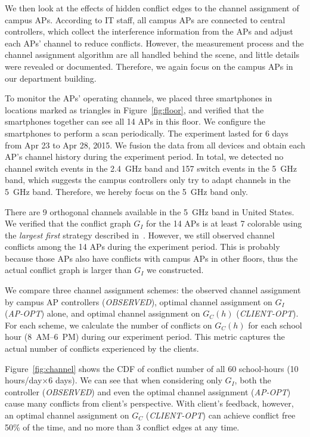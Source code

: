 We then look at the effects of hidden conflict edges to the channel assignment
of campus APs. According to \ub{} IT staff, all campus APs are connected to
central controllers, which collect the interference information from the APs and
adjust each APs' channel to reduce conflicts. However, the measurement process
and the channel assignment algorithm are all handled behind the scene, and
little details were revealed or documented. Therefore, we again focus on
the campus APs in our department building.

To monitor the APs' operating channels, we placed three smartphones in locations
marked as triangles in Figure~\ref{fig:floor}, and verified that the smartphones
together can see all 14 APs in this floor. We configure the smartphones to
perform a \wifi{} scan periodically. The experiment lasted for 6 days from Apr
23 to Apr 28, 2015. We fusion the data from all devices and obtain each AP's
channel history during the experiment period. In total, we detected no channel
switch events in the 2.4~GHz band and 157 switch events in the 5~GHz band, which
suggests the campus controllers only try to adapt channels in the 5~GHz band.
Therefore, we hereby focus on the 5~GHz band only.

There are 9 orthogonal channels available in the 5~GHz band in United States. We
verified that the conflict graph $G_I$ for the 14 APs is at least 7 colorable
using the \textit{largest first} strategy described
in~\cite{kosowski2004classical}.  However, we still observed channel conflicts
among the 14 APs during the experiment period. This is probably because those APs
also have conflicts with campus APs in other floors, thus the actual conflict
graph is larger than $G_I$ we constructed.

We compare three channel assignment schemes: the observed channel assignment by
campus AP controllers (\textit{OBSERVED}), optimal channel assignment on $G_I$
(\textit{AP-OPT}) alone, and optimal channel assignment on $G_C(h)$
(\textit{CLIENT-OPT}). For each scheme, we calculate the number of conflicts on
$G_C(h)$ for each school hour (8~AM--6~PM) during our experiment period. This
metric captures the actual number of conflicts experienced by the clients.

Figure~\ref{fig:channel} shows the CDF of conflict number of all 60 school-hours
(10 hours/day$\times$6 days). We can see that when considering only $G_I$, both the
controller (\textit{OBSERVED}) and even the optimal channel assignment
(\textit{AP-OPT}) cause many conflicts from client's perspective. With client's
feedback, however, an optimal channel assignment on $G_C$ (\textit{CLIENT-OPT})
can achieve conflict free 50\% of the time, and no more than 3 conflict edges
at any time.


